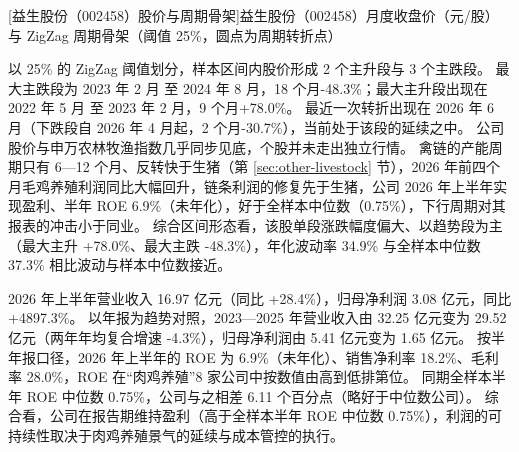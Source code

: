 \begin{center}
\begin{minipage}{\textwidth}\centering
{}

[益生股份（002458）股价与周期骨架]{益生股份（002458）月度收盘价（元/股）与 ZigZag 周期骨架（阈值 25\%，圆点为周期转折点）}
\end{minipage}
\end{center}

 以 25\% 的 ZigZag 阈值划分，样本区间内股价形成 2 个主升段与 3 个主跌段。 最大主跌段为 2023 年 2 月 至 2024 年 8 月，18 个月-48.3\%；最大主升段出现在 2022 年 5 月 至 2023 年 2 月，9 个月+78.0\%。 最近一次转折出现在 2026 年 6 月（下跌段自 2026 年 4 月起，2 个月-30.7\%），当前处于该段的延续之中。 公司股价与申万农林牧渔指数几乎同步见底，个股并未走出独立行情。 禽链的产能周期只有 6---12 个月、反转快于生猪（第 \ref{sec:other-livestock} 节），2026 年前四个月毛鸡养殖利润同比大幅回升，链条利润的修复先于生猪，公司 2026 年上半年实现盈利、半年 ROE 6.9\%（未年化），好于全样本中位数（0.75\%），下行周期对其报表的冲击小于同业。 综合区间形态看，该股单段涨跌幅度偏大、以趋势段为主（最大主升 +78.0\%、最大主跌 -48.3\%），年化波动率 34.9\% 与全样本中位数 37.3\% 相比波动与样本中位数接近。

 2026 年上半年营业收入 16.97 亿元（同比 +28.4\%），归母净利润 3.08 亿元，同比 +4897.3\%。 以年报为趋势对照，2023---2025 年营业收入由 32.25 亿元变为 29.52 亿元（两年年均复合增速 -4.3\%），归母净利润由 5.41 亿元变为 1.65 亿元。 按半年报口径，2026 年上半年的 ROE 为 6.9\%（未年化）、销售净利率 18.2\%、毛利率 28.0\%，ROE 在“肉鸡养殖”8 家公司中按数值由高到低排第位。 同期全样本半年 ROE 中位数 0.75\%，公司与之相差 6.11 个百分点（略好于中位数公司）。 综合看，公司在报告期维持盈利（高于全样本半年 ROE 中位数 0.75\%），利润的可持续性取决于肉鸡养殖景气的延续与成本管控的执行。

